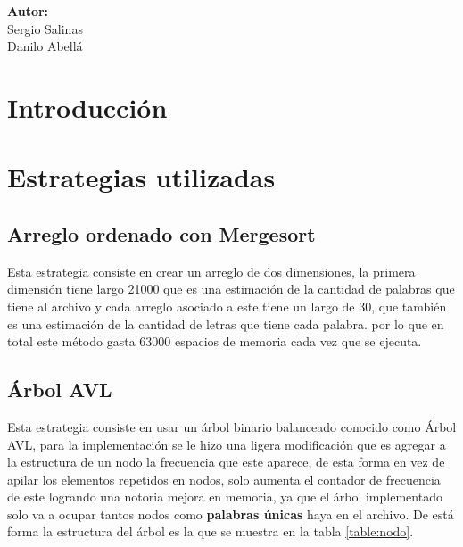 \documentclass[12pt,letterpaper]{scrartcl}
\begin{document}
\begin{titlepage}
\begin{center}
\begin{minipage}[l]{0.4\textwidth}
	\begin{flushright}

		\textbf{\textsf{Autor:}}\\
		\linespread{1}
		\large Sergio Salinas\\
		\large Danilo Abellá\\

	\end{flushright}
\end{minipage}

\end{center}

\end{titlepage}



\newpage

\tableofcontents

 
\section{Introducción} 

\section{Estrategias utilizadas}

\subsection{Arreglo ordenado con Mergesort}

Esta estrategia consiste en crear un arreglo de dos dimensiones, la primera dimensión tiene largo 21000 que es una estimación de la cantidad de palabras que tiene al archivo y cada arreglo asociado a este tiene un largo de 30, que también es una estimación de la cantidad de letras que tiene cada palabra. por lo que en total este método gasta 63000 espacios de memoria cada vez que se ejecuta.

\subsection{Árbol AVL}

Esta estrategia consiste en usar un árbol binario balanceado conocido como Árbol AVL, para la implementación se le hizo una ligera modificación que es agregar a la estructura de un nodo la frecuencia que este aparece, de esta forma en vez de apilar los elementos repetidos en nodos, solo aumenta el contador de frecuencia de este logrando una notoria mejora en memoria, ya que el árbol implementado solo va a ocupar tantos nodos como \textbf{palabras únicas} haya en el archivo. De está forma la estructura del árbol es la que se muestra en la tabla \ref{table:nodo}.
\end{document}
